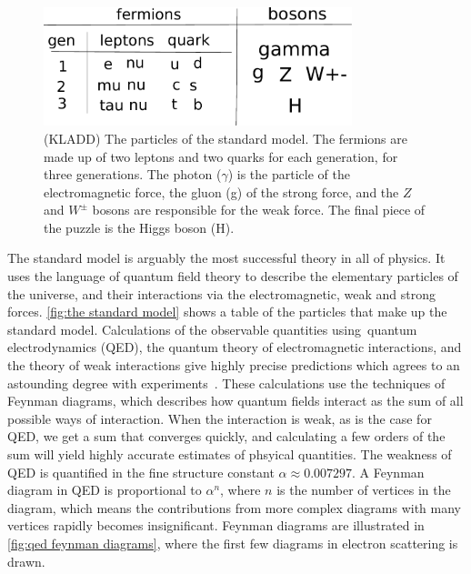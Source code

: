 





\begin{figure}[h]
    \centering
    \includegraphics[width=0.8\textwidth]{figurer/standard_model.pdf}
    \caption{(KLADD) The particles of the standard model. The fermions are made up of two leptons and two quarks for each generation, for three generations. The photon ($\gamma$) is the particle of the electromagnetic force, the gluon (g) of the strong force, and the $Z$ and $W^\pm$ bosons are responsible for the weak force. The final piece of the puzzle is the Higgs boson (H).}
    \label{fig:the standard model}
\end{figure}


The standard model is arguably the most successful theory in all of physics.
It uses the language of quantum field theory to describe the elementary particles of the universe, and their interactions via the electromagnetic, weak and strong forces.
\autoref{fig:the standard model} shows a table of the particles that make up the standard model.
Calculations of the observable quantities using quantum electrodynamics (QED), the quantum theory of electromagnetic interactions, and the theory of weak interactions give highly precise predictions which agrees to an astounding degree with experiments~\cite{Schwartz:QFT}.
These calculations use the techniques of Feynman diagrams, which describes how quantum fields interact as the sum of all possible ways of interaction.
When the interaction is weak, as is the case for QED, we get a sum that converges quickly, and calculating a few orders of the sum will yield highly accurate estimates of phsyical quantities.
The weakness of QED is quantified in the fine structure constant $\alpha \approx 0.00 7297$\cite{PDG}.
A Feynman diagram in QED is proportional to $\alpha^n$, where $n$ is the number of vertices in the diagram, which means the contributions from more complex diagrams with many vertices rapidly becomes insignificant.
Feynman diagrams are illustrated in \autoref{fig:qed feynman diagrams}, where the first few diagrams in electron scattering is drawn.

